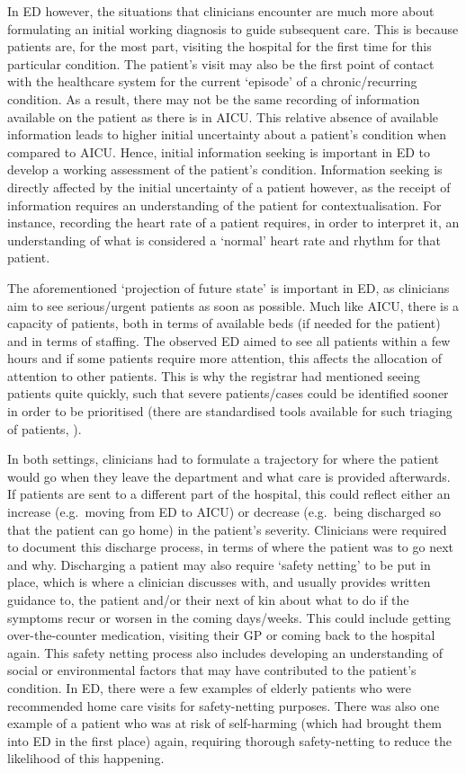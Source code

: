 \documentclass[a4paper, nobind]{templates/ociamthesis}
\begin{document}
\hfill\break
In ED however, the situations that clinicians encounter are much more about formulating an initial working diagnosis to guide subsequent care. This is because patients are, for the most part, visiting the hospital for the first time for this particular condition. The patient's visit may also be the first point of contact with the healthcare system for the current `episode' of a chronic/recurring condition. As a result, there may not be the same recording of information available on the patient as there is in AICU. This relative absence of available information leads to higher initial uncertainty about a patient's condition when compared to AICU. Hence, initial information seeking is important in ED to develop a working assessment of the patient's condition. Information seeking is directly affected by the initial uncertainty of a patient however, as the receipt of information requires an understanding of the patient for contextualisation. For instance, recording the heart rate of a patient requires, in order to interpret it, an understanding of what is considered a `normal' heart rate and rhythm for that patient.

\hfill\break
The aforementioned `projection of future state' is important in ED, as clinicians aim to see serious/urgent patients as soon as possible. Much like AICU, there is a capacity of patients, both in terms of available beds (if needed for the patient) and in terms of staffing. The observed ED aimed to see all patients within a few hours and if some patients require more attention, this affects the allocation of attention to other patients. This is why the registrar had mentioned seeing patients quite quickly, such that severe patients/cases could be identified sooner in order to be prioritised (there are standardised tools available for such triaging of patients, \textcite{noauthor_about_2024}).

\hfill\break
In both settings, clinicians had to formulate a trajectory for where the patient would go when they leave the department and what care is provided afterwards. If patients are sent to a different part of the hospital, this could reflect either an increase (e.g.~moving from ED to AICU) or decrease (e.g.~being discharged so that the patient can go home) in the patient's severity. Clinicians were required to document this discharge process, in terms of where the patient was to go next and why. Discharging a patient may also require `safety netting' to be put in place, which is where a clinician discusses with, and usually provides written guidance to, the patient and/or their next of kin about what to do if the symptoms recur or worsen in the coming days/weeks. This could include getting over-the-counter medication, visiting their GP or coming back to the hospital again. This safety netting process also includes developing an understanding of social or environmental factors that may have contributed to the patient's condition. In ED, there were a few examples of elderly patients who were recommended home care visits for safety-netting purposes. There was also one example of a patient who was at risk of self-harming (which had brought them into ED in the first place) again, requiring thorough safety-netting to reduce the likelihood of this happening.
\end{document}
